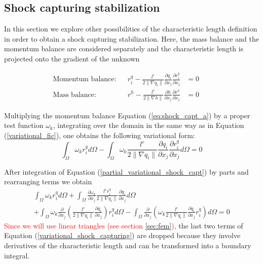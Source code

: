 \documentclass[a4paper,12pt]{elsarticle}
\newcommand{\Miguel}[1]{\textcolor{red}{#1}}
\newcommand{\pder}[2]{\frac{\partial#1}{\partial#2}}
\newcommand{\norm}[1]{\lVert#1\rVert}
\begin{document}
\subsection{Shock capturing stabilization}

In this section we explore other possibilities of the characteristic length definition in order to obtain a shock capturing stabilization. Here, the mass balance and the momentum balance are considered separately and the characteristic length is projected onto the gradient of the unknown

\begin{subequations} \label{eq:shock_capt}
\begin{align}
\text{Momentum balance:} &&
    r_i^q - \frac{l^e}{2\norm{\nabla q_i}}\pder{q_i}{x_j}\pder{r_i^q}{x_j} &= 0 \label{eq:shock_capt_a} && \\ 
\text{Mass balance:} &&
    r^h - \frac{l^e}{2\norm{\nabla h}} \pder{h}{x_j} \pder{r^h}{x_j} &=0 \label{eq:shock_capt_b}
\end{align}
\end{subequations}

Multiplying the momentum balance Equation (\ref{eq:shock_capt_a}) by a proper test function $\omega_k$, integrating over the domain in the same way as in Equation (\ref{variational_fic}),
one obtains the following variational form:
\begin{equation}
    \int_\Omega \omega_k r_i^q d\Omega
     - \int_\Omega \omega_k \frac{l^e}{2\norm{\nabla q_i}}\pder{q_i}{x_j}\pder{r_i^q}{x_j}
     d\Omega = 0
    \label{partial_variational_shock_capt}
\end{equation}

After integration of Equation (\ref{partial_variational_shock_capt}) by parts and rearranging terms we obtain
\begin{multline}
    \int_\Omega \omega_k r_i^q d\Omega 
    + \int_\Omega \pder{\omega_k}{x_j}
        \frac{l^e r_i^q}{2\norm{\nabla q_i}}\pder{q_i}{x_j} d\Omega \\
    + \int_\Omega \omega_k \pder{}{x_j}\left(
         \frac{l^e}{2\norm{\nabla q_i}}\pder{q_i}{x_j}
        \right)r_i^q d\Omega 
    - \int_\Omega \pder{}{x_j}\left(
        \omega_k \frac{l^e}{2\norm{\nabla q_i}}\pder{q_i}{x_j}r_i^q \right) d\Omega
        = 0
        \label{variational_shock_capturing}
\end{multline}
\Miguel{
Since we will use linear triangles (see section \ref{sec:fem}),
}%
the last two terms of Equation (\ref{variational_shock_capturing}) are dropped because they involve derivatives of the characteristic length and can be transformed into a boundary integral.
\end{document}
